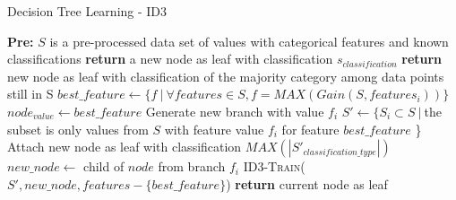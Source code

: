 \begin{algorithm}[tbh]
\caption{Decision Tree Learning - ID3}\label{alg:ID3}
\begin{algorithmic}[1]
	\State \textbf{Pre:} $S$ is a pre-processed data set of values with categorical features and known classifications
    	\State \textbf{return} a new node as leaf with classification $s_{classification}$
    \EndIf
    	\State \textbf{return} new node as leaf with classification of the majority category among data points still in S 
    \Else
    	\State $best\_feature \gets \{f \> | \> \forall features \in S, f = MAX(Gain(S,features_i))\}$
        \State $node_{value} \gets best\_feature$
        	\State Generate new branch with value $f_i$
            \State $S' \gets \{S_i \subset S \> | \>$the subset is only values from $S$ with feature value $f_i$ for feature $best\_feature$ \} 
            	\State Attach new node as leaf with classification $MAX(|S'_{classification\_type}|)$
            \Else
            	\State $new\_node \gets $ child of $node$ from branch $f_i$
            	\State \textsc{ID3-Train}($S', new\_node, features - \{best\_feature\}$)
            \EndIf
        \EndFor
    \EndIf
    \State \textbf{return} current node as leaf
\EndProcedure
\end{algorithmic}
\end{algorithm}






